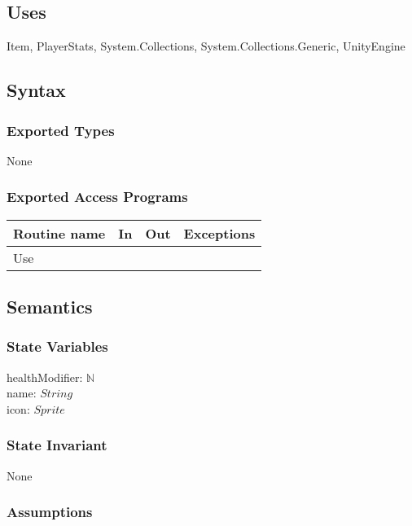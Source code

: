 \documentclass[12pt]{article}
\begin{document}
\subsection* {Uses}

Item, PlayerStats, System.Collections, System.Collections.Generic, UnityEngine

\subsection* {Syntax}

\subsubsection* {Exported Types}

None

\subsubsection* {Exported Access Programs}

\begin{tabular}{| l | l | l | l |}
\hline
\textbf{Routine name} & \textbf{In} & \textbf{Out} & \textbf{Exceptions}\\
\hline
Use & ~ & ~ & ~\\
\hline
\end{tabular}

\subsection* {Semantics}

\subsubsection* {State Variables}

healthModifier: $\mathbb{N}$\\
name: $String$\\
icon: $Sprite$

\subsubsection* {State Invariant}

None

\subsubsection* {Assumptions}
\end{document}
